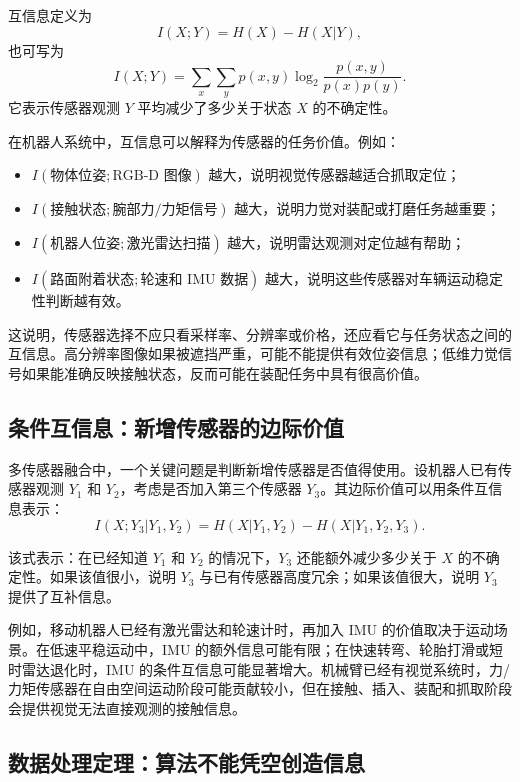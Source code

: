\documentclass[UTF8,a4paper,12pt]{ctexart}
\begin{document}
互信息定义为
\begin{equation}
I(X;Y)=H(X)-H(X|Y),
\end{equation}
也可写为
\begin{equation}
I(X;Y)=\sum_x\sum_y p(x,y)\log_2\frac{p(x,y)}{p(x)p(y)}.
\end{equation}
它表示传感器观测 $Y$ 平均减少了多少关于状态 $X$ 的不确定性。

在机器人系统中，互信息可以解释为传感器的任务价值。例如：
\begin{itemize}
  \item $I(\text{物体位姿};\text{RGB-D 图像})$ 越大，说明视觉传感器越适合抓取定位；
  \item $I(\text{接触状态};\text{腕部力/力矩信号})$ 越大，说明力觉对装配或打磨任务越重要；
  \item $I(\text{机器人位姿};\text{激光雷达扫描})$ 越大，说明雷达观测对定位越有帮助；
  \item $I(\text{路面附着状态};\text{轮速和 IMU 数据})$ 越大，说明这些传感器对车辆运动稳定性判断越有效。
\end{itemize}

这说明，传感器选择不应只看采样率、分辨率或价格，还应看它与任务状态之间的互信息。高分辨率图像如果被遮挡严重，可能不能提供有效位姿信息；低维力觉信号如果能准确反映接触状态，反而可能在装配任务中具有很高价值。

\subsection{条件互信息：新增传感器的边际价值}

多传感器融合中，一个关键问题是判断新增传感器是否值得使用。设机器人已有传感器观测 $Y_1$ 和 $Y_2$，考虑是否加入第三个传感器 $Y_3$。其边际价值可以用条件互信息表示：
\begin{equation}
I(X;Y_3|Y_1,Y_2)=H(X|Y_1,Y_2)-H(X|Y_1,Y_2,Y_3).
\end{equation}

该式表示：在已经知道 $Y_1$ 和 $Y_2$ 的情况下，$Y_3$ 还能额外减少多少关于 $X$ 的不确定性。如果该值很小，说明 $Y_3$ 与已有传感器高度冗余；如果该值很大，说明 $Y_3$ 提供了互补信息。

例如，移动机器人已经有激光雷达和轮速计时，再加入 IMU 的价值取决于运动场景。在低速平稳运动中，IMU 的额外信息可能有限；在快速转弯、轮胎打滑或短时雷达退化时，IMU 的条件互信息可能显著增大。机械臂已经有视觉系统时，力/力矩传感器在自由空间运动阶段可能贡献较小，但在接触、插入、装配和抓取阶段会提供视觉无法直接观测的接触信息。

\subsection{数据处理定理：算法不能凭空创造信息}
\end{document}

